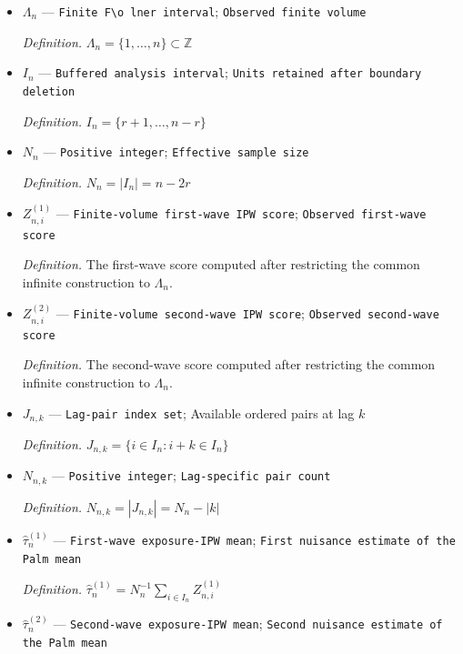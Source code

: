 \documentclass{article}
\begin{document}
\begin{itemize}
  \par\smallskip\noindent\emph{Definition.} \(\Omega_{\mathrm{pop}}=\sum_{k=-2r}^{2r}\gamma_h(k)\)
  \item \(\Lambda_n\) --- \texttt{Finite F\textbackslash{}\allowbreak{}o lner interval}; \texttt{Observed finite volume}
  \par\smallskip\noindent\emph{Definition.} \(\Lambda_n=\{1,\ldots,n\}\subset\mathbb Z\)
  \item \(I_n\) --- \texttt{Buffered analysis interval}; \texttt{Units retained after boundary deletion}
  \par\smallskip\noindent\emph{Definition.} \(I_n=\{r+1,\ldots,n-r\}\)
  \item \(N_n\) --- \texttt{Positive integer}; \texttt{Effective sample size}
  \par\smallskip\noindent\emph{Definition.} \(N_n=|I_n|=n-2r\)
  \item \(Z_{n,i}^{(1)}\) --- \texttt{Finite-\allowbreak{}volume first-\allowbreak{}wave IPW score}; \texttt{Observed first-\allowbreak{}wave score}
  \par\smallskip\noindent\emph{Definition.} The first-wave score computed after restricting the common infinite construction to \(\Lambda_n\).
  \item \(Z_{n,i}^{(2)}\) --- \texttt{Finite-\allowbreak{}volume second-\allowbreak{}wave IPW score}; \texttt{Observed second-\allowbreak{}wave score}
  \par\smallskip\noindent\emph{Definition.} The second-wave score computed after restricting the common infinite construction to \(\Lambda_n\).
  \item \(J_{n,k}\) --- \texttt{Lag-\allowbreak{}pair index set}; Available ordered pairs at lag \(k\)
  \par\smallskip\noindent\emph{Definition.} \(J_{n,k}=\{i\in I_n:i+k\in I_n\}\)
  \item \(N_{n,k}\) --- \texttt{Positive integer}; \texttt{Lag-\allowbreak{}specific pair count}
  \par\smallskip\noindent\emph{Definition.} \(N_{n,k}=|J_{n,k}|=N_n-|k|\)
  \item \(\widehat\tau_n^{(1)}\) --- \texttt{First-\allowbreak{}wave exposure-\allowbreak{}IPW mean}; \texttt{First nuisance estimate of the Palm mean}
  \par\smallskip\noindent\emph{Definition.} \(\widehat\tau_n^{(1)}=N_n^{-1}\sum_{i\in I_n}Z_{n,i}^{(1)}\)
  \item \(\widehat\tau_n^{(2)}\) --- \texttt{Second-\allowbreak{}wave exposure-\allowbreak{}IPW mean}; \texttt{Second nuisance estimate of the Palm mean}

\end{itemize}
\end{document}
